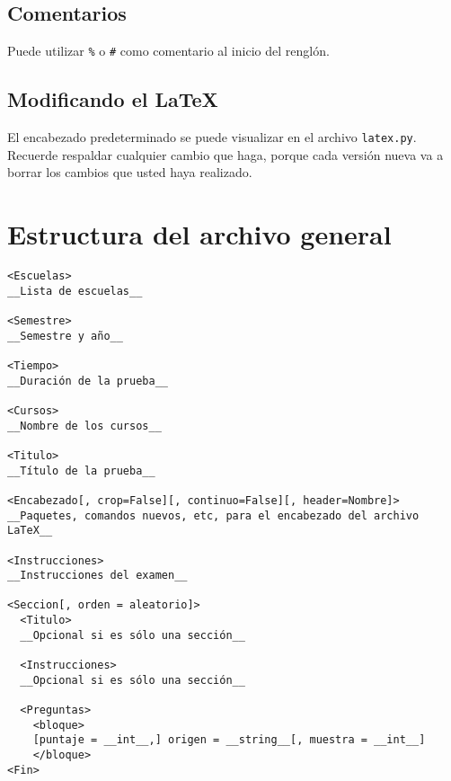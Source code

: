 \documentclass[12pt]{article}
\theoremstyle{definition}
\begin{document}
\subsection{Comentarios}
Puede utilizar \verb|%| o \verb|#| como comentario al inicio del renglón.

\subsection{Modificando el \LaTeX}
El encabezado predeterminado se puede visualizar en el archivo \verb|latex.py|. Recuerde respaldar cualquier cambio que haga, porque cada versión nueva va a borrar los cambios que usted haya realizado.

\section{Estructura del archivo general}
\small
\begin{verbatim}
<Escuelas>
__Lista de escuelas__

<Semestre>
__Semestre y año__

<Tiempo>
__Duración de la prueba__

<Cursos>
__Nombre de los cursos__

<Titulo>
__Título de la prueba__

<Encabezado[, crop=False][, continuo=False][, header=Nombre]>
__Paquetes, comandos nuevos, etc, para el encabezado del archivo LaTeX__

<Instrucciones>
__Instrucciones del examen__

<Seccion[, orden = aleatorio]>
  <Titulo>
  __Opcional si es sólo una sección__

  <Instrucciones>
  __Opcional si es sólo una sección__

  <Preguntas>
    <bloque>
    [puntaje = __int__,] origen = __string__[, muestra = __int__]
    </bloque>
<Fin>
\end{verbatim}
\normalsize
\end{document}

